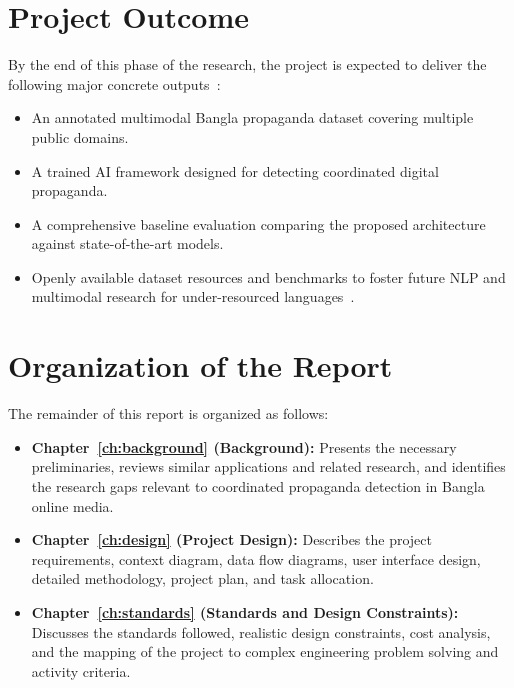 \section{Project Outcome}
By the end of this phase of the research, the project is expected to deliver the
following major concrete outputs~\cite{hossain2020}:
\begin{itemize}
  \item An annotated multimodal Bangla propaganda dataset covering multiple public
        domains.
  \item A trained AI framework designed for detecting coordinated digital
        propaganda.
  \item A comprehensive baseline evaluation comparing the proposed architecture
        against state-of-the-art models.
  \item Openly available dataset resources and benchmarks to foster future NLP and
        multimodal research for under-resourced languages~\cite{hristakieva2022}.
\end{itemize}

\section{Organization of the Report}
The remainder of this report is organized as follows:
\begin{itemize}
  \item \textbf{Chapter~\ref{ch:background} (Background):} Presents the necessary
        preliminaries, reviews similar applications and related research, and
        identifies the research gaps relevant to coordinated propaganda detection
        in Bangla online media.
  \item \textbf{Chapter~\ref{ch:design} (Project Design):} Describes the project
        requirements, context diagram, data flow diagrams, user interface design,
        detailed methodology, project plan, and task allocation.
  \item \textbf{Chapter~\ref{ch:standards} (Standards and Design Constraints):}
        Discusses the standards followed, realistic design constraints, cost
        analysis, and the mapping of the project to complex engineering problem
        solving and activity criteria.
\end{itemize}